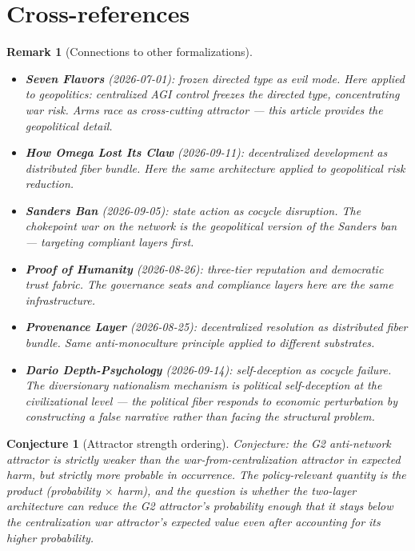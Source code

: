 \documentclass[11pt,a4paper]{article}
\newtheorem{conjecture}[definition]{Conjecture}
\newtheorem{remark}[definition]{Remark}
\begin{document}
\section{Cross-references}

\begin{remark}[Connections to other formalizations]
\begin{itemize}
\item \textbf{Seven Flavors} (2026-07-01): frozen directed type as
  evil mode. Here applied to geopolitics: centralized AGI control
  freezes the directed type, concentrating war risk. Arms race as
  cross-cutting attractor --- this article provides the geopolitical
  detail.
\item \textbf{How Omega Lost Its Claw} (2026-09-11): decentralized
  development as distributed fiber bundle. Here the same architecture
  applied to geopolitical risk reduction.
\item \textbf{Sanders Ban} (2026-09-05): state action as cocycle
  disruption. The chokepoint war on the network is the geopolitical
  version of the Sanders ban --- targeting compliant layers first.
\item \textbf{Proof of Humanity} (2026-08-26): three-tier reputation
  and democratic trust fabric. The governance seats and compliance
  layers here are the same infrastructure.
\item \textbf{Provenance Layer} (2026-08-25): decentralized resolution
  as distributed fiber bundle. Same anti-monoculture principle applied
  to different substrates.
\item \textbf{Dario Depth-Psychology} (2026-09-14): self-deception as
  cocycle failure. The diversionary nationalism mechanism is political
  self-deception at the civilizational level --- the political fiber
  responds to economic perturbation by constructing a false narrative
  rather than facing the structural problem.
\end{itemize}
\end{remark}

\begin{conjecture}[Attractor strength ordering]
Conjecture: the G2 anti-network attractor is strictly weaker than the
war-from-centralization attractor in expected harm, but strictly more
probable in occurrence. The policy-relevant quantity is the product
(probability $\times$ harm), and the question is whether the
two-layer architecture can reduce the G2 attractor's probability
enough that it stays below the centralization war attractor's
expected value even after accounting for its higher probability.
\end{conjecture}
\end{document}
